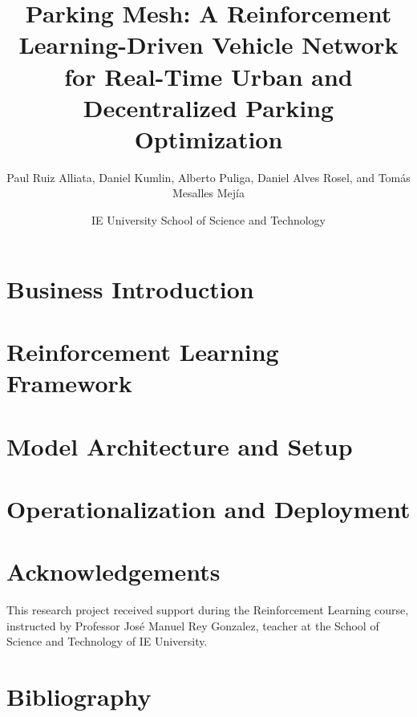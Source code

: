 \documentclass[twocolumn]{NobArticle}
\title{Parking Mesh: A Reinforcement Learning-Driven Vehicle Network for Real-Time Urban and Decentralized Parking Optimization}
\author{
    Paul Ruiz Alliata, 
    Daniel Kumlin,
    Alberto Puliga,
    Daniel Alves Rosel, 
    and Tomás Mesalles Mejía
}
\date{
    IE University School of Science and Technology
}
\begin{document}
\small
\maketitle

\section{Business Introduction}


 
  
        

\section{Reinforcement Learning Framework}
 


\section{Model Architecture and Setup}


                                          

\section{Operationalization and Deployment}





\section*{Acknowledgements}
This research project received support during the Reinforcement Learning course, instructed by Professor José Manuel Rey Gonzalez, teacher at the School of Science and Technology of IE University.

\section{Bibliography}
\printbibliography
\end{document}

